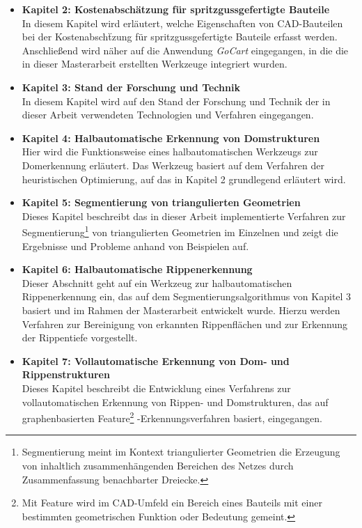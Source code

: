 \begin{itemize}
\item  \textbf{Kapitel 2: Kostenabsch\"atzung f\"ur spritzgussgefertigte Bauteile}\\
In diesem Kapitel wird erl\"autert, welche Eigenschaften von CAD-Bauteilen bei der Kostenabsch\"tzung f\"ur spritzgussgefertigte Bauteile erfasst werden. Anschlie{\ss}end wird n\"aher auf die Anwendung \textit{GoCart} eingegangen, in die die in dieser  Masterarbeit erstellten Werkzeuge integriert wurden.


\item  \textbf{Kapitel 3: Stand der Forschung und Technik}\\
In diesem Kapitel wird auf den Stand der Forschung und Technik der in dieser Arbeit verwendeten Technologien und Verfahren eingegangen. 

\item  \textbf{Kapitel 4: Halbautomatische Erkennung von Domstrukturen}\\
Hier wird die Funktionsweise eines halbautomatischen Werkzeugs zur Domerkennung erl\"autert. Das Werkzeug basiert auf dem Verfahren der heuristischen Optimierung, auf das in Kapitel 2 grundlegend erl\"autert wird. 

\item  \textbf{Kapitel 5: Segmentierung von triangulierten Geometrien}\\
Dieses Kapitel beschreibt das in dieser Arbeit implementierte Verfahren zur Segmentierung\footnote{Segmentierung meint im Kontext triangulierter Geometrien die Erzeugung von inhaltlich zusammenhängenden Bereichen des Netzes durch Zusammenfassung benachbarter Dreiecke.} von triangulierten Geometrien im Einzelnen und zeigt die Ergebnisse und Probleme anhand von Beispielen auf.

\item  \textbf{Kapitel 6: Halbautomatische Rippenerkennung}\\
Dieser Abschnitt geht auf ein Werkzeug zur halbautomatischen Rippenerkennung ein, das auf dem Segmentierungsalgorithmus von Kapitel 3 basiert und im Rahmen der Masterarbeit entwickelt wurde. Hierzu werden Verfahren zur Bereinigung von erkannten Rippenfl\"achen und zur Erkennung der Rippentiefe vorgestellt.

\item  \textbf{Kapitel 7: Vollautomatische Erkennung von Dom- und Rippenstrukturen}\\
Dieses Kapitel beschreibt die Entwicklung eines Verfahrens zur vollautomatischen Erkennung von Rippen- und Domstrukturen, das auf graphenbasierten Feature\footnote{Mit Feature wird im CAD-Umfeld ein Bereich eines Bauteils mit einer bestimmten geometrischen Funktion oder Bedeutung gemeint.} -Erkennungsverfahren basiert, eingegangen. 


\end{itemize}
